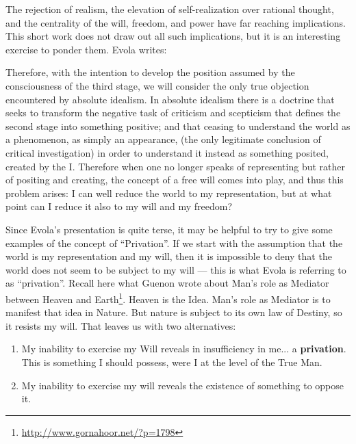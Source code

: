 The rejection of realism, the elevation of self-realization over rational thought, and the centrality of the will, freedom, and power have far reaching implications. This short work does not draw out all such implications, but it is an interesting exercise to ponder them. Evola writes:

\begin{quotex}
Therefore, with the intention to develop the position assumed by the consciousness of the third stage, we will consider the only true objection encountered by absolute idealism. In absolute idealism there is a doctrine that seeks to transform the negative task of criticism and scepticism that defines the second stage into something positive; and that ceasing to understand the world as a phenomenon, as simply an appearance, (the only legitimate conclusion of critical investigation) in order to understand it instead as something posited, created by the I. Therefore when one no longer speaks of representing but rather of positing and creating, the concept of a free will comes into play, and thus this problem arises: I can well reduce the world to my representation, but at what point can I reduce it also to my will and my freedom?
\end{quotex}


Since Evola's presentation is quite terse, it may be helpful to try to give some examples of the concept of ``Privation''. If we start with the assumption that the world is my representation and my will, then it is impossible to deny that the world does not seem to be subject to my will --- this is what Evola is referring to as ``privation''. Recall here what Guenon wrote about Man's role as Mediator between Heaven and Earth\footnote{\url{http://www.gornahoor.net/?p=1798}}. Heaven is the Idea. Man's role as Mediator is to manifest that idea in Nature. But nature is subject to its own law of Destiny, so it resists my will. That leaves us with two alternatives:

\begin{enumerate}


\item My inability to exercise my Will reveals in insufficiency in me... a \textbf{privation}. This is something I should possess, were I at the level of the True Man.

\item My inability to exercise my will reveals the existence of something to oppose it.
\end{enumerate}


